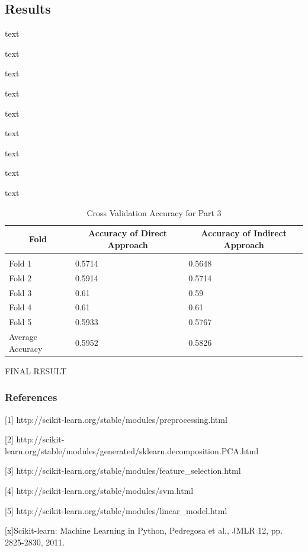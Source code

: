 \documentclass{article} %
\begin{document}
\subsection{Results}
text

text

text

text

text

text

text

text

text

\begin{table}[h]
\caption{Cross Validation Accuracy for Part 3}
\label{classtable}
\begin{center}
	\begin{tabular}{lll}
		\multicolumn{1}{c}{\bf Fold}  &\multicolumn{1}{c}{\bf Accuracy of Direct Approach} &\multicolumn{1}{c}{\bf Accuracy of Indirect Approach} 
		\\ \hline \\
		Fold 1   &0.5714 &0.5648 \\
		Fold 2   &0.5914 &0.5714 \\
		Fold 3   &0.61 &0.59 \\
		Fold 4   &0.61   &0.61 \\
		Fold 5   &0.5933   &0.5767 \\
		Average Accuracy   &0.5952 &0.5826\\
	\end{tabular}
\end{center}
\end{table} 

FINAL RESULT

\subsubsection*{References}

\small{
[1] http://scikit-learn.org/stable/modules/preprocessing.html

[2] http://scikit-learn.org/stable/modules/generated/sklearn.decomposition.PCA.html

[3] http://scikit-learn.org/stable/modules/feature\_selection.html

[4] http://scikit-learn.org/stable/modules/svm.html

[5] http://scikit-learn.org/stable/modules/linear\_model.html

[x]Scikit-learn: Machine Learning in Python, Pedregosa et al., JMLR 12, pp. 2825-2830, 2011.

}
\end{document}
